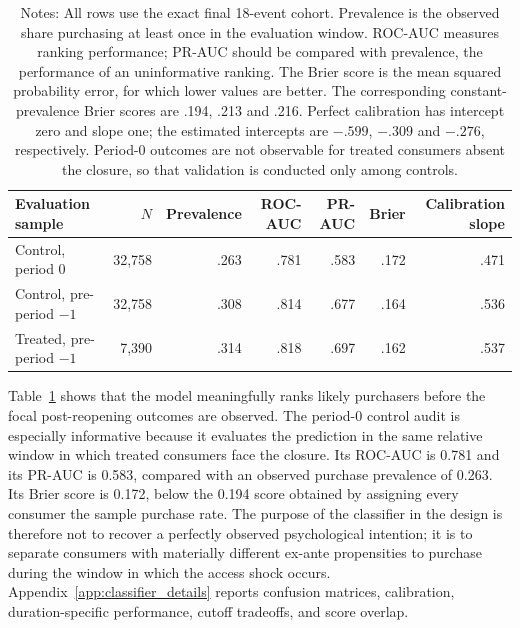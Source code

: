 \documentclass[11 pt]{article}
\newcommand\fnote[1]{\captionsetup{font=footnotesize}\caption*{#1}}
\begin{document}
\begin{table}[!ht]
\centering
\caption{Purchase-intention classifier performance on the final cohort}
\label{tab:classifier_diagnostics}
\small
\begin{tabularx}{\textwidth}{Xrrrrrr}
\toprule
Evaluation sample & $N$ & Prevalence & ROC-AUC & PR-AUC & Brier & Calibration slope \\
\midrule
Control, period 0 & 32,758 & .263 & .781 & .583 & .172 & .471 \\
Control, pre-period $-1$ & 32,758 & .308 & .814 & .677 & .164 & .536 \\
Treated, pre-period $-1$ & 7,390 & .314 & .818 & .697 & .162 & .537 \\
\bottomrule
\end{tabularx}
\vspace{1mm}
\fnote{Notes: All rows use the exact final 18-event cohort. Prevalence is the observed share purchasing at least once in the evaluation window. ROC-AUC measures ranking performance; PR-AUC should be compared with prevalence, the performance of an uninformative ranking. The Brier score is the mean squared probability error, for which lower values are better. The corresponding constant-prevalence Brier scores are .194, .213 and .216. Perfect calibration has intercept zero and slope one; the estimated intercepts are $-.599$, $-.309$ and $-.276$, respectively. Period-0 outcomes are not observable for treated consumers absent the closure, so that validation is conducted only among controls.}
\end{table}

Table~\ref{tab:classifier_diagnostics} shows that the model meaningfully ranks likely purchasers before the focal post-reopening outcomes are observed. The period-0 control audit is especially informative because it evaluates the prediction in the same relative window in which treated consumers face the closure. Its ROC-AUC is 0.781 and its PR-AUC is 0.583, compared with an observed purchase prevalence of 0.263. Its Brier score is 0.172, below the 0.194 score obtained by assigning every consumer the sample purchase rate. The purpose of the classifier in the design is therefore not to recover a perfectly observed psychological intention; it is to separate consumers with materially different ex-ante propensities to purchase during the window in which the access shock occurs. Appendix~\ref{app:classifier_details} reports confusion matrices, calibration, duration-specific performance, cutoff tradeoffs, and score overlap.
\end{document}
